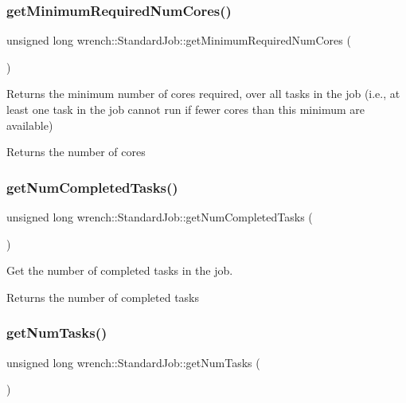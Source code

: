 \subsubsection{\texorpdfstring{get\+Minimum\+Required\+Num\+Cores()}{getMinimumRequiredNumCores()}}
{\footnotesize\ttfamily unsigned long wrench\+::\+Standard\+Job\+::get\+Minimum\+Required\+Num\+Cores (\begin{DoxyParamCaption}{ }\end{DoxyParamCaption})}



Returns the minimum number of cores required, over all tasks in the job (i.\+e., at least one task in the job cannot run if fewer cores than this minimum are available) 

\begin{DoxyReturn}{Returns}
the number of cores 
\end{DoxyReturn}
\mbox{\label{classwrench_1_1_standard_job_a7dfe8f307875dcf375fea01bbd9b0fb6}} 
\subsubsection{\texorpdfstring{get\+Num\+Completed\+Tasks()}{getNumCompletedTasks()}}
{\footnotesize\ttfamily unsigned long wrench\+::\+Standard\+Job\+::get\+Num\+Completed\+Tasks (\begin{DoxyParamCaption}{ }\end{DoxyParamCaption})}



Get the number of completed tasks in the job. 

\begin{DoxyReturn}{Returns}
the number of completed tasks 
\end{DoxyReturn}
\mbox{\label{classwrench_1_1_standard_job_a5672a5454c94741589dde8edd8d9c56f}} 
\subsubsection{\texorpdfstring{get\+Num\+Tasks()}{getNumTasks()}}
{\footnotesize\ttfamily unsigned long wrench\+::\+Standard\+Job\+::get\+Num\+Tasks (\begin{DoxyParamCaption}{ }\end{DoxyParamCaption})}



